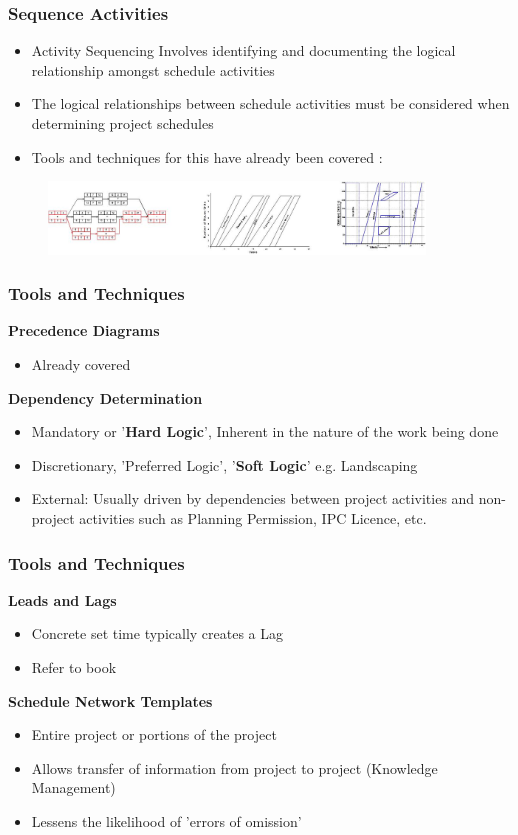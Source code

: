 \begin{frame}
\frametitle{Sequence Activities}
\begin{itemize}
	\item Activity Sequencing Involves identifying and documenting the logical relationship amongst schedule activities
	\item The logical relationships between schedule activities must be considered when determining project schedules
	\item Tools and techniques for this have already been covered :
\end{itemize}

\begin{figure}
	\centering
		\includegraphics[width = 10cm]{images/schtypes.jpg}
	\label{fig:schtypes}
\end{figure}

\end{frame}




\begin{frame}
\frametitle{Tools and Techniques}
\textbf{Precedence Diagrams}
\begin{itemize}
	\item Already covered
\end{itemize}
\textbf{Dependency Determination}
\begin{itemize}
	\item Mandatory	or '\textbf{Hard Logic}', Inherent in the nature of the work being done
	\item Discretionary, 'Preferred Logic', '\textbf{Soft Logic}' e.g. Landscaping
	\item External: Usually driven by dependencies between project activities and non-project activities such as Planning Permission, IPC Licence, etc.
\end{itemize}
\end{frame}




\begin{frame}
\frametitle{Tools and Techniques}
\textbf{Leads and Lags}
\begin{itemize}
	\item Concrete set time typically creates a Lag
	\item Refer to book 
\end{itemize}
\textbf{Schedule Network Templates}
\begin{itemize}
	\item Entire project or portions of the project
	\item Allows transfer of information from project to project (Knowledge Management)
	\item Lessens the likelihood of 'errors of omission'
\end{itemize}
\end{frame}




